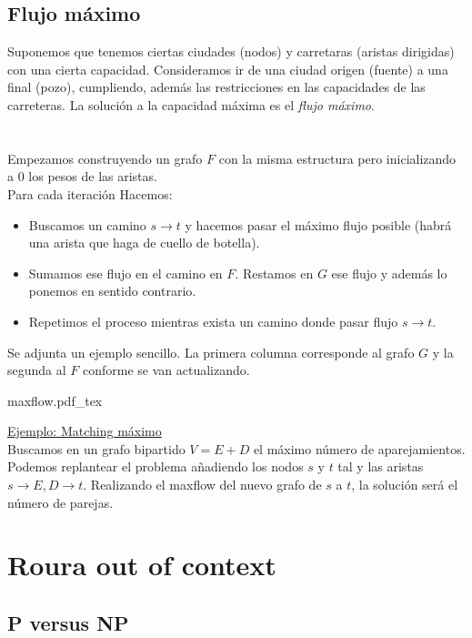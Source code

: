\documentclass[leqno]{article}
\newcommand{\incfig}[1]{%
  \begin{center}
  \def\svgwidth{0.9\columnwidth}
  {#1.pdf_tex}
  \end{center}
}
\newcommand{\algo}[2]{\boxed{\textbf{Algoritmo: }\textit{#1} \quad \mathcal{O}(#2)}}
\newcommand{\ex}[1]{\underline{Ejemplo:  #1}}
\begin{document}
\subsection{Flujo máximo}
Suponemos que tenemos ciertas ciudades (nodos) y carretaras (aristas dirigidas) con una cierta capacidad. Consideramos ir de una ciudad origen (fuente) a una final (pozo), cumpliendo, además las restricciones en las capacidades de las carreteras. La solución a la capacidad máxima es el \textit{flujo máximo}. \\
\\
\algo{Flujo máximo}{}\\
Empezamos construyendo un grafo $F$ con la misma estructura pero inicializando a $0$ los pesos de las aristas.\\
Para cada iteración Hacemos:
\begin{itemize}
  \item Buscamos un camino $s\to t$ y hacemos pasar el máximo flujo posible (habrá una arista que haga de cuello de botella).
  \item Sumamos ese flujo en el camino en $F$. Restamos en $G$ ese flujo y además lo ponemos en sentido contrario.
  \item Repetimos el proceso mientras exista un camino donde pasar flujo $s\to t$.
\end{itemize}
\noindent
Se adjunta un ejemplo sencillo. La primera columna corresponde al grafo $G$ y la segunda al  $F$ conforme se van actualizando.
\incfig{maxflow}
\ex{Matching máximo}\\
Buscamos en un grafo bipartido $V = E + D$ el máximo número de aparejamientos.\\
Podemos replantear el problema añadiendo los nodos $s$ y $t$ tal y las aristas $s \to E, D\to t$. Realizando el maxflow del nuevo grafo de $s$ a $t$, la solución será el número de parejas.



\section{Roura out of context}
\subsection{P versus NP}
\end{document}
